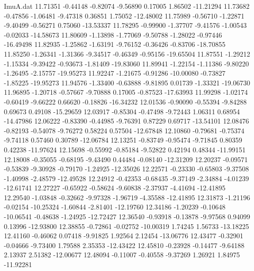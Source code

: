 \begin{filecontents}{ImuA.dat}
  11.71351   -0.44148   -0.82074   -9.56890    0.17005    1.86502  -11.21294
  11.73682   -0.47856   -1.06481   -9.47318    0.36851    1.75052  -12.48002
  11.75989   -0.56710   -1.22871   -9.40499   -0.56271    0.75060  -13.53337
  11.78295   -0.99900   -1.37707   -9.41576   -1.00543   -0.02033  -14.58673
  11.80609   -1.13898   -1.77069   -9.50788   -1.28022   -0.97446  -16.49498
  11.82935   -1.25862   -1.63191   -9.76152   -0.36426   -0.83706  -18.70855
  11.85250   -1.26341   -1.31366   -9.34517   -0.46349   -0.95156  -19.65504
  11.87551   -1.29212   -1.15334   -9.39422   -0.93673   -1.81409  -19.83060
  11.89941   -1.22154   -1.11386   -9.80220   -1.26495   -2.15757  -19.95273
  11.92247   -1.21675   -0.91286  -10.00080   -0.73827   -1.85225  -19.95273
  11.94576   -1.33400   -0.63888   -9.81895    0.01739   -1.33321  -19.06730
  11.96895   -1.20718   -0.57667   -9.70888    0.17005   -0.87523  -17.63993
  11.99298   -1.02174   -0.60419   -9.66222    0.66620   -0.18826  -16.34232
  12.01536   -0.90090   -0.55394   -9.84288    0.69673    0.49108  -15.29659
  12.03917   -0.85304   -0.47498   -9.72443    1.06311    0.68954  -14.47986
  12.06222   -0.83390   -0.44985   -9.76391    0.87229    0.69717  -13.54101
  12.08476   -0.82193   -0.54078   -9.76272    0.58224    0.57504  -12.67848
  12.10860   -0.79681   -0.75374   -9.74118    0.57460    0.30789  -12.06784
  12.13251   -0.83749   -0.95474   -9.71845    0.80359    0.42238  -11.97624
  12.15698   -0.55992   -0.85184   -9.52822    0.42194    0.48344  -11.99151
  12.18008   -0.35055   -0.68195   -9.43490    0.44484   -0.08140  -12.31209
  12.20237   -0.09571   -0.53839   -9.30928   -0.79170   -1.24925  -12.35026
  12.22571   -0.23330   -0.65803   -9.37508   -1.40998   -2.48579  -12.49528
  12.24912   -0.42353   -0.68435   -9.37149   -2.34884   -4.01239  -12.61741
  12.27227   -0.65922   -0.58624   -9.60838   -2.37937   -4.41694  -12.41895
  12.29540   -1.03848   -0.32662   -9.97328   -1.96719   -4.35588  -12.41895
  12.31873   -1.21196   -0.02154  -10.25324   -1.60844   -2.81401  -12.19760
  12.34186   -1.20239   -0.10648  -10.06541   -0.48638   -1.24925  -12.72427
  12.36540   -0.93918   -0.13878   -9.97568    0.94099    0.13996  -12.93800
  12.38855   -0.72861   -0.02752  -10.00319    1.74245    1.56733  -13.18225
  12.41160   -0.46062    0.07418   -9.91825    1.92564    2.12454  -13.06776
  12.43477   -0.32901   -0.04666   -9.73400    1.79588    2.35353  -12.43422
  12.45810   -0.23928   -0.14477   -9.64188    2.13937    2.51382  -12.00677
  12.48094   -0.11007   -0.40558   -9.37269    1.26921    1.84975  -11.92281

\end{filecontents}
